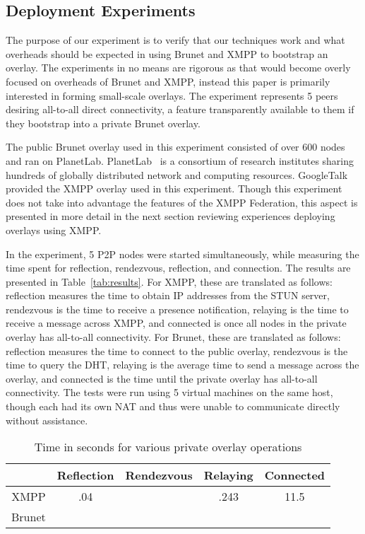 \documentclass[conference]{IEEEtran}
\begin{document}
\subsection{Deployment Experiments}

The purpose of our experiment is to verify that our techniques work and what
overheads should be expected in using Brunet and XMPP to bootstrap an overlay.
The experiments in no means are rigorous as that would become overly focused on
overheads of Brunet and XMPP, instead this paper is primarily interested in
forming small-scale overlays.  The experiment represents 5 peers desiring
all-to-all direct connectivity, a feature transparently available to them if
they bootstrap into a private Brunet overlay.

The public Brunet overlay used in this experiment consisted of over 600 nodes
and ran on PlanetLab.  PlanetLab~\cite{planetlab} is a consortium of research
institutes sharing hundreds of globally distributed network and computing
resources.  GoogleTalk provided the XMPP overlay used in this experiment.
Though this experiment does not take into advantage the features of the XMPP
Federation, this aspect is presented in more detail in the next section
reviewing experiences deploying overlays using XMPP.

In the experiment, 5 P2P nodes were started simultaneously, while measuring the
time spent for reflection, rendezvous, reflection, and connection.  The results
are presented in Table~\ref{tab:results}.  For XMPP, these are translated as
follows:  reflection measures the time to obtain IP addresses from the STUN
server, rendezvous is the time to receive a presence notification, relaying is
the time to receive a message across XMPP, and connected is once all nodes in
the private overlay has all-to-all connectivity.  For Brunet, these are
translated as follows:  reflection measures the time to connect to the public
overlay, rendezvous is the time to query the DHT, relaying is the average time
to send a message across the overlay, and connected is the time until the
private overlay has all-to-all connectivity.  The tests were run using 5
virtual machines on the same host, though each had its own NAT and thus were
unable to communicate directly without assistance.

\begin{table}[ht]
\centering
\begin{tabular}{|c||c|c|c|c|}
\hline & Reflection & Rendezvous & Relaying & Connected \\ \hline \hline
XMPP & .04 & & .243 & 11.5 \\ \hline
Brunet & & & & \\ \hline
\end{tabular}
\caption{Time in seconds for various private overlay operations}
\label{tab:overlays}
\end{table}
\end{document}
